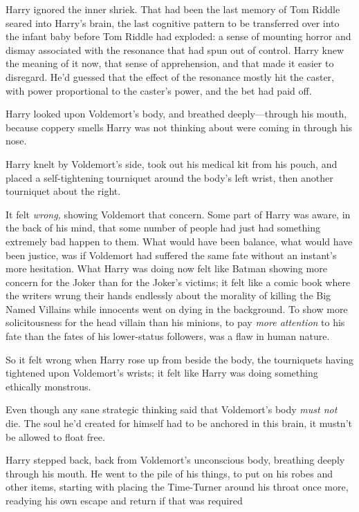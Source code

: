 Harry ignored the inner shriek. That had been the last memory of Tom Riddle
seared into Harry's brain, the last cognitive pattern to be transferred over
into the infant baby before Tom Riddle had exploded: a sense of mounting horror
and dismay associated with the resonance that had spun out of control. Harry
knew the meaning of it now, that sense of apprehension, and that made it easier
to disregard. He'd guessed that the effect of the resonance mostly hit the
caster, with power proportional to the caster's power, and the bet had paid off.

Harry looked upon Voldemort's body, and breathed deeply---through his mouth,
because coppery smells Harry was not thinking about were coming in through his
nose.

Harry knelt by Voldemort's side, took out his medical kit from his pouch, and
placed a self-tightening tourniquet around the body's left wrist, then another
tourniquet about the right.

It felt \emph{wrong,} showing Voldemort that concern. Some part of Harry was
aware, in the back of his mind, that some number of people had just had
something extremely bad happen to them. What would have been balance, what
would have been justice, was if Voldemort had suffered the same fate without an
instant's more hesitation. What Harry was doing now felt like Batman showing
more concern for the Joker than for the Joker's victims; it felt like a comic
book where the writers wrung their hands endlessly about the morality of
killing the Big Named Villains while innocents went on dying in the background.
To show more solicitousness for the head villain than his minions, to pay
\emph{more attention} to his fate than the fates of his lower-status followers,
was a flaw in human nature.

So it felt wrong when Harry rose up from beside the body, the tourniquets
having tightened upon Voldemort's wrists; it felt like Harry was doing
something ethically monstrous.

Even though any sane strategic thinking said that Voldemort's body \emph{must
not} die. The soul he'd created for himself had to be anchored in this brain,
it mustn't be allowed to float free.

Harry stepped back, back from Voldemort's unconscious body, breathing deeply
through his mouth. He went to the pile of his things, to put on his robes and
other items, starting with placing the Time-Turner around his throat once more,
readying his own escape and return if that was required{\el}

